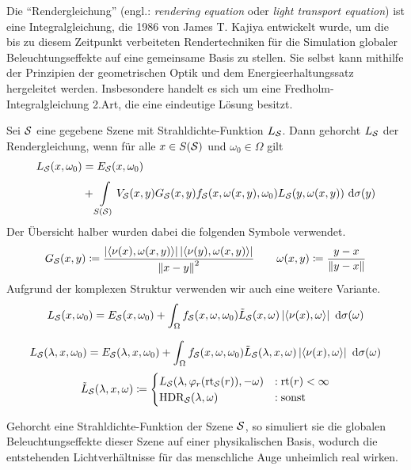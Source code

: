 		Die \enquote{Rendergleichung} (engl.: \textit{rendering equation} oder \textit{light transport equation}) ist eine Integralgleichung, die 1986 von James T. Kajiya entwickelt wurde, um die bis zu diesem Zeitpunkt verbeiteten Rendertechniken für die Simulation globaler Beleuchtungseffekte auf eine gemeinsame Basis zu stellen.
		Sie selbst kann mithilfe der Prinzipien der geometrischen Optik und dem Energieerhaltungssatz hergeleitet werden.
		Insbesondere handelt es sich um eine Fredholm-Integralgleichung 2.Art, die eine eindeutige Lösung besitzt.
		\begin{definition}[Rendergleichung]
			Sei $\mathcal{S}$ eine gegebene Szene mit Strahldichte-Funktion $L_{\mathcal{S}}$.
			Dann gehorcht $L_{\mathcal{S}}$ der Rendergleichung, wenn für alle $x\in S(\mathcal{S})$ und $\omega_0\in \Omega$ gilt
			\begin{alignat*}{3}
				L_{\mathcal{S}}(x,\omega_0) &= E_{\mathcal{S}}(x,\omega_0) \\
				&+\int\limits_{S(\mathcal{S})}^{}  V_{\mathcal{S}}(x,y) G_{\mathcal{S}}(x,y) f_{\mathcal{S}}(x,\omega(x,y),\omega_0) L_{\mathcal{S}}(y,\omega(x,y)) \ \mathrm{d} \sigma(y)
			\end{alignat*}
			Der Übersicht halber wurden dabei die folgenden Symbole verwendet.
			\[
				G_{\mathcal{S}}(x,y) \coloneqq \frac{\left\vert \left\langle \nu(x),\omega(x,y) \right\rangle \right\vert\left\vert \left\langle \nu(y),\omega(x,y) \right\rangle \right\vert}{\left\| x-y \right\|^2}\qquad \omega(x,y) \coloneqq \frac{y-x}{\left\| y-x \right\|}
			\]
			Aufgrund der komplexen Struktur verwenden wir auch eine weitere Variante.
			\[
				L_{\mathcal{S}}(x,\omega_0) = E_{\mathcal{S}}(x,\omega_0) + \int_{\Omega}^{}  f_{\mathcal{S}}(x,\omega,\omega_0)\tilde{L}_{\mathcal{S}}(x,\omega) \left\vert \left\langle \nu(x),\omega \right\rangle \right\vert \ \mathrm{d} \sigma(\omega)
			\]
		\end{definition}

		\begin{definition}
			\[
				L_{\mathcal{S}}(\lambda,x,\omega_0) = E_{\mathcal{S}}(\lambda,x,\omega_0) + \int_{\Omega}^{}  f_{\mathcal{S}}(x,\omega,\omega_0)\tilde{L}_{\mathcal{S}}(\lambda,x,\omega) \left\vert \left\langle \nu(x),\omega \right\rangle \right\vert \ \mathrm{d} \sigma(\omega)
			\]
			\[
				\tilde{L}_{\mathcal{S}}(\lambda,x,\omega)\coloneqq
				\begin{cases}
					L_{\mathcal{S}}(\lambda,\varphi_r(\mathrm{rt}_{\mathcal{S}}(r)),-\omega) &: \mathrm{rt}(r) < \infty \\
					\mathrm{HDR}_{\mathcal{S}}(\lambda,\omega) &: \mathrm{sonst}
				\end{cases}
			\]
		\end{definition}

		Gehorcht eine Strahldichte-Funktion der Szene $\mathcal{S}$, so simuliert sie die globalen Beleuchtungseffekte dieser Szene auf einer physikalischen Basis, wodurch die entstehenden Lichtverhältnisse für das menschliche Auge unheimlich real wirken.

